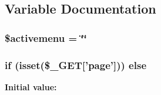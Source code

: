 \subsection{Variable Documentation}
\hypertarget{index_8php_a606397301b3a4a7f882588514b3b849c}{
\subsubsection[{\$activemenu}]{\setlength{\rightskip}{0pt plus 5cm}\$activemenu = \char`\"{}\char`\"{}}}\label{index_8php_a606397301b3a4a7f882588514b3b849c}
\hypertarget{index_8php_a774ab6fa47523bbcd9994f2bacd3d179}{
\subsubsection[{else}]{\setlength{\rightskip}{0pt plus 5cm}if (isset(\$\-\_\-\-G\-E\-T\mbox{[}'page'\mbox{]})) else}}\label{index_8php_a774ab6fa47523bbcd9994f2bacd3d179}
{\bfseries Initial value\-:}
